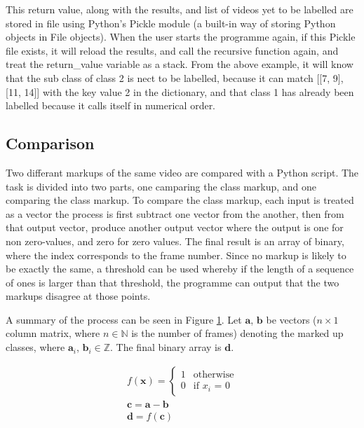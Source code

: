     This return value, along with the results, and list of videos yet to be labelled are stored in file using Python's Pickle module (a built-in way of storing Python objects in File objects). When the user starts the programme again, if this Pickle file exists, it will reload the results, and call the recursive function again, and treat the return\_value variable as a stack. From the above example, it will know that the sub class of class 2 is nect to be labelled, because it can match [[7, 9], [11, 14]] with the key value 2 in the dictionary, and that class 1 has already been labelled because it calls itself in numerical order.

    \subsection{Comparison}
    Two differant markups of the same video are compared with a Python script. The task is divided into two parts, one camparing the class markup, and one comparing the class markup.  To compare the class markup, each input is treated as a vector the process is first subtract one vector from the another, then from that output vector, produce another output vector where the output is one for non zero-values, and zero for zero values. The final result is an array of binary, where the index corresponds to the frame number. Since no markup is likely to be exactly the same, a threshold can be used whereby if the length of a sequence of ones is larger than that threshold, the programme can output that the two markups disagree at those points.
    
    A summary of the process can be seen in Figure \ref{fig:classprocessing}. Let $\pmb{a}$, $\pmb{b}$ be vectors ($n \times 1$ column matrix, where $n \in \mathbb{N}$ is the number of frames) denoting the marked up classes, where $\pmb{a}_i$, $\pmb{b}_i \in \mathbb{Z}$. The final binary array is $\pmb{d}$.
    \begin{figure}[h]
        \centering
        \begin{gather*}
            f(\pmb{x})=
        \begin{cases}%
        1      & \text{otherwise}\\
        0      & \text{if $x_i$ = 0}
        \end{cases} \\
        \pmb{c}=\pmb{a}-\pmb{b} \\
        \pmb{d}=f(\pmb{c})
        \end{gather*}
        \caption{}
        \label{fig:classprocessing}
    \end{figure}

